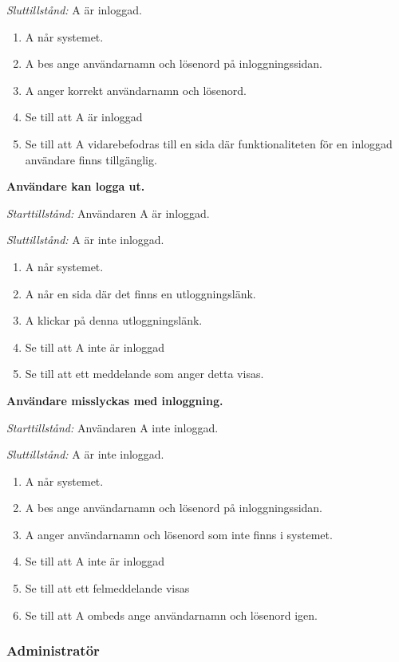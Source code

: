 \documentclass[a4paper]{article}
\begin{document}
\begin{ST}
\emph{Sluttillstånd:} A är inloggad.

\begin{enumerate}
\item A når systemet.
\item A bes ange användarnamn och lösenord på inloggningssidan.
\item A anger korrekt användarnamn och lösenord.
\item Se till att A är inloggad
\item Se till att A vidarebefodras till en sida där funktionaliteten för en inloggad användare finns tillgänglig.
\end{enumerate}

\item
\textbf{Användare kan logga ut.}

\emph{Starttillstånd:} Användaren A är inloggad.

\emph{Sluttillstånd:} A är inte inloggad.

\begin{enumerate}
\item A når systemet.
\item A når en sida där det finns en utloggningslänk.
\item A klickar på denna utloggningslänk.
\item Se till att A inte är inloggad
\item Se till att ett meddelande som anger detta visas.
\end{enumerate}

\item
\textbf{Användare misslyckas med inloggning.}

\emph{Starttillstånd:} Användaren A inte inloggad.

\emph{Sluttillstånd:} A är inte inloggad.

\begin{enumerate}
\item A når systemet.
\item A bes ange användarnamn och lösenord på inloggningssidan.
\item A anger användarnamn och lösenord som inte finns i systemet.
\item Se till att A inte är inloggad
\item Se till att ett felmeddelande visas
\item Se till att A ombeds ange användarnamn och lösenord igen.
\end{enumerate}


\subsubsection{Administratör}


\end{ST}
\end{document}
